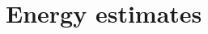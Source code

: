 \documentclass[12pt,reqno]{amsart}
\newcommand{\h}{{\bf H}}
\theoremstyle{definition}
\numberwithin{equation}{section}
\newcommand{\intr}[1]{\mathrm{int}(#1)}
\def\Gwh{\Omega_h}
\begin{document}
	


	

	\section{Energy estimates}
%
% 
%
\end{document}
